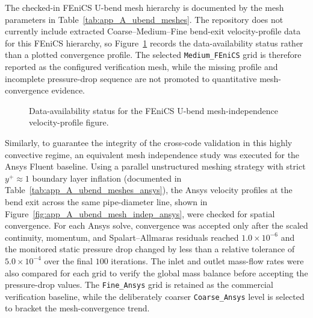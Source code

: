 The checked-in FEniCS U-bend mesh hierarchy is documented by the mesh parameters in Table~\ref{tab:app_A_ubend_meshes}. The repository does not currently include extracted Coarse--Medium--Fine bend-exit velocity-profile data for this FEniCS hierarchy, so Figure~\ref{fig:app_A_ubend_mesh_independence} records the data-availability status rather than a plotted convergence profile. The selected \texttt{Medium\_FEniCS} grid is therefore reported as the configured verification mesh, while the missing profile and incomplete pressure-drop sequence are not promoted to quantitative mesh-convergence evidence.

\begin{figure}[htpb]
	\centering
	\caption{Data-availability status for the FEniCS U-bend mesh-independence velocity-profile figure.}
	\label{fig:app_A_ubend_mesh_independence}
\end{figure}

Similarly, to guarantee the integrity of the cross-code validation in this highly convective regime, an equivalent mesh independence study was executed for the Ansys Fluent baseline. Using a parallel unstructured meshing strategy with strict $y^+ \approx 1$ boundary layer inflation (documented in Table~\ref{tab:app_A_ubend_meshes_ansys}), the Ansys velocity profiles at the bend exit across the same pipe-diameter line, shown in Figure~\ref{fig:app_A_ubend_mesh_indep_ansys}, were checked for spatial convergence. For each Ansys solve, convergence was accepted only after the scaled continuity, momentum, and Spalart--Allmaras residuals reached $1.0\times10^{-6}$ and the monitored static pressure drop changed by less than a relative tolerance of $5.0\times10^{-4}$ over the final $100$ iterations. The inlet and outlet mass-flow rates were also compared for each grid to verify the global mass balance before accepting the pressure-drop values. The \texttt{Fine\_Ansys} grid is retained as the commercial verification baseline, while the deliberately coarser \texttt{Coarse\_Ansys} level is selected to bracket the mesh-convergence trend.

